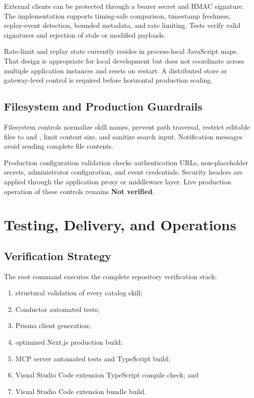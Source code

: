 \documentclass[12pt]{report}
\newcommand{\notverified}{\textbf{Not verified}}
\begin{document}
External clients can be protected through a bearer secret and HMAC signature. The implementation supports timing-safe comparison, timestamp freshness, replay-event detection, bounded metadata, and rate limiting. Tests verify valid signatures and rejection of stale or modified payloads.

Rate-limit and replay state currently resides in process-local JavaScript maps. That design is appropriate for local development but does not coordinate across multiple application instances and resets on restart. A distributed store or gateway-level control is required before horizontal production scaling.

\section{Filesystem and Production Guardrails}

Filesystem controls normalize skill names, prevent path traversal, restrict editable files to  and , limit content size, and sanitize search input. Notification messages avoid sending complete file contents.

Production configuration validation checks authentication URLs, non-placeholder secrets, administrator configuration, and event credentials. Security headers are applied through the application proxy or middleware layer. Live production operation of these controls remains \notverified{}.

\chapter{Testing, Delivery, and Operations}

\section{Verification Strategy}

The root command  executes the complete repository verification stack:

\begin{enumerate}
  \item structural validation of every catalog skill;
  \item Conductor automated tests;
  \item Prisma client generation;
  \item optimized Next.js production build;
  \item MCP server automated tests and TypeScript build;
  \item Visual Studio Code extension TypeScript compile check; and
  \item Visual Studio Code extension bundle build.
\end{enumerate}
\end{document}
